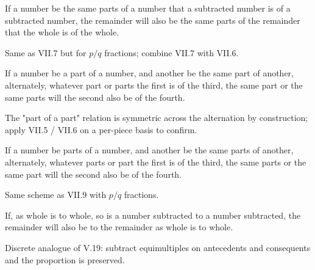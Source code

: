 \begin{claim}
\label{prop:VII.8}
If a number be the same parts of a number that a subtracted number
is of a subtracted number, the remainder will also be the same parts
of the remainder that the whole is of the whole.
\end{claim}
\begin{evidence}
\label{ev:VII.8}
Same as VII.7 but for $p/q$ fractions; combine VII.7 with VII.6.
\end{evidence}

\begin{claim}
\label{prop:VII.9}
If a number be a part of a number, and another be the same part of
another, alternately, whatever part or parts the first is of the
third, the same part or the same parts will the second also be of
the fourth.
\end{claim}
\begin{evidence}
\label{ev:VII.9}
The "part of a part" relation is symmetric across the alternation by
construction; apply VII.5 / VII.6 on a per-piece basis to confirm.
\end{evidence}

\begin{claim}
\label{prop:VII.10}
If a number be parts of a number, and another be the same parts of
another, alternately, whatever parts or part the first is of the
third, the same parts or the same part will the second also be of
the fourth.
\end{claim}
\begin{evidence}
\label{ev:VII.10}
Same scheme as VII.9 with $p/q$ fractions.
\end{evidence}

\begin{claim}
\label{prop:VII.11}
If, as whole is to whole, so is a number subtracted to a number
subtracted, the remainder will also be to the remainder as whole is
to whole.
\end{claim}
\begin{evidence}
\label{ev:VII.11}
Discrete analogue of V.19: subtract equimultiples on antecedents and
consequents and the proportion is preserved.
\end{evidence}

